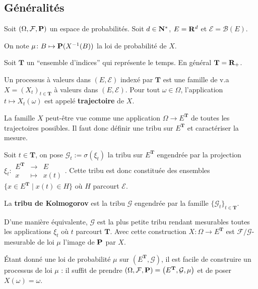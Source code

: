 \subsection{Généralités}

	Soit $(\Omega,\mathcal{F},\mathbf{P})$ un espace de probabilités.
	Soit $d \in \mathbf{N}^*$, $E = \mathbf{R}^d$ et $\mathcal{E} = \mathcal{B}(E)$.
	
	On note $\mu \colon B \mapsto \mathbf{P}(X^{-1}(B))$ la loi de probabilité de $X$.
	
	Soit $\mathbf{T}$ un “ensemble d'indices” qui représente le temps.
	En général $\mathbf{T} = \mathbf{R}_+$.
	
	\begin{defn}
		Un processus à valeurs dans $(E,\mathcal{E})$ indexé par $\mathbf{T}$ est une famille de v.a $X = (X_t)_{t \in \mathbf{T}}$ à valeurs dans $(E,\mathcal{E})$.
		Pour tout $\omega \in \Omega$, l'application $t \mapsto X_t(\omega)$ est appelé \textbf{trajectoire} de $X$.
	\end{defn}
	
	La famille $X$ peut-être vue comme une application $\Omega \to E^{\mathbf{T}}$ de toutes les trajectoires possibles.
	Il faut donc définir une tribu sur $E^{\mathbf{T}}$ et caractériser la mesure.
	
	Soit $t \in \mathbf{T}$, on pose $\mathcal{G}_t := \sigma(\xi_t)$ la tribu sur $E^{\mathbf{T}}$ engendrée par la projection $\xi_t \colon \begin{array}{lcr} E^{\mathbf{T}} & \to & E \\ x & \mapsto & x(t) \end{array}$.
	Cette tribu est donc constituée des ensembles $\{ x \in E^{\mathbf{T}} \mid x(t) \in H \}$ où $H$ parcourt $\mathcal{E}$.
	
	\begin{defn}
		La \textbf{tribu de Kolmogorov} est la tribu $\mathcal{G}$ engendrée par la famille $\{ \mathcal{G}_t \}_{t \in \mathbf{T}}$.
	\end{defn}
	
	D'une manière équivalente, $\mathcal{G}$ est la plus petite tribu rendant mesurables toutes les applications $\xi_t$ où $t$ parcourt $\mathbf{T}$.
	Avec cette construction $X \colon \Omega \to E^{\mathbf{T}}$ est $\mathcal{F}/\mathcal{G}$-mesurable de loi $\mu$ l'image de $\mathbf{P}$ par $X$.
	
	Étant donné une loi de probabilité $\mu$ sur $\left( E^{\mathbf{T}}, \mathcal{G} \right)$, il est facile de construire un processus de loi $\mu$ : il suffit de prendre $(\Omega, \mathcal{F}, \mathbf{P}) = \left( E^{\mathbf{T}}, \mathcal{G}, \mu \right)$ et de poser $X(\omega) = \omega$.
	

